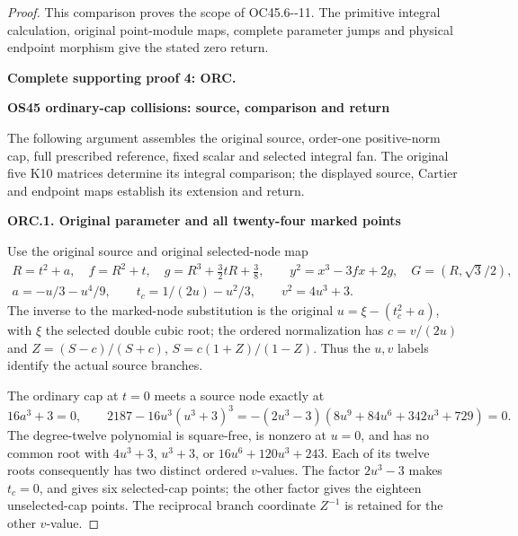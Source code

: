 \begin{proof}
This comparison proves the scope of OC45.6-\/-11. The primitive
integral calculation, original point-module maps, complete parameter
jumps and physical endpoint morphism give the stated zero return.



\par\bigskip\noindent\textbf{Complete supporting proof 4: ORC.}\par


\par

\medskip\noindent\textbf{OS45 ordinary-cap collisions: source, comparison and return}

\par\nobreak

The following argument assembles the original source,
order-one positive-norm cap, full prescribed reference,
fixed scalar and selected integral fan.
The original five K10 matrices determine its integral
comparison; the displayed source, Cartier and endpoint
maps establish its extension and return.

\par

\medskip\noindent\textbf{ORC.1. Original parameter and all twenty-four marked points}

\par\nobreak

Use the original source and original selected-node map
\[
\begin{gathered}
R=t^2+a,\quad f=R^2+t,\quad
g=R^3+\tfrac32tR+\tfrac38,\qquad
y^2=x^3-3fx+2g,\quad G=(R,\sqrt3/2),\\
a=-u/3-u^4/9,\qquad t_c=1/(2u)-u^2/3,\qquad
v^2=4u^3+3 .
\end{gathered}
\tag{ORC.1}
\]
The inverse to the marked-node substitution is the original
\(u=\xi-(t_c^2+a)\), with \(\xi\) the selected double cubic root;
the ordered normalization has \(c=v/(2u)\) and
\(Z=(S-c)/(S+c)\), \(S=c(1+Z)/(1-Z)\).
Thus the \(u,v\) labels identify the actual source branches.

The ordinary cap at \(t=0\) meets a source node exactly at
\[
16a^3+3=0,\qquad
2187-16u^3(u^3+3)^3
=-(2u^3-3)(8u^9+84u^6+342u^3+729)=0.
\tag{ORC.2}
\]
The degree-twelve polynomial is square-free, is nonzero at \(u=0\),
and has no common root with \(4u^3+3\), \(u^3+3\), or
\(16u^6+120u^3+243\). Each of its twelve roots consequently has
two distinct ordered \(v\)-values. The factor \(2u^3-3\) makes
\(t_c=0\), and gives six selected-cap points; the other factor
gives the eighteen unselected-cap points. The reciprocal branch
coordinate \(Z^{-1}\) is retained for the other \(v\)-value.


\end{proof}
